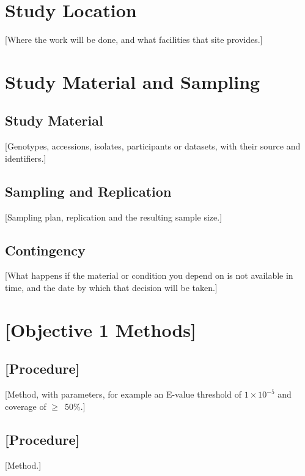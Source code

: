\section{Study Location}\label{sec:3.2}
{[}Where the work will be done, and what facilities that site provides.]

\section{Study Material and Sampling}\label{sec:3.3}

\subsection{Study Material}\label{sec:3.3.1}
{[}Genotypes, accessions, isolates, participants or datasets, with their source and identifiers.]

\subsection{Sampling and Replication}\label{sec:3.3.2}

{[}Sampling plan, replication and the resulting sample size.]

\subsection{Contingency}\label{sec:3.3.3}
{[}What happens if the material or condition you depend on is not available in time, and the date by which that decision will be taken.]

\section{[Objective 1 Methods]}\label{sec:3.4}

\subsection{[Procedure]}\label{sec:3.4.1}
{[}Method, with parameters, for example an E-value threshold of $1\times10^{-5}$ and coverage of $\geq$~50\%.]

\subsection{[Procedure]}\label{sec:3.4.2}
{[}Method.]

